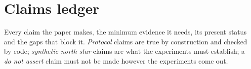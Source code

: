 \section{Claims ledger}
\label{app:claims}

Every claim the paper makes, the minimum evidence it needs, its present status and the gaps that
block it. \emph{Protocol} claims are true by construction and checked by code; \emph{synthetic north
star} claims are what the experiments must establish; a \emph{do not assert} claim must not be made
however the experiments come out.

\newcommand\claimentry[5]{%
  \par\smallskip\noindent
  \begin{tcolorbox}[enhanced, breakable, colback=ezpaper, colframe=ezpaper, arc=1.5pt,
      left=7pt, right=7pt, top=4pt, bottom=4pt, before skip=3pt, after skip=3pt, fontupper=\small]
  {\sffamily\sbseries\color{ezaccent}#1}\quad #2\hfill{\sffamily\footnotesize\color{ezgrey}#4}\par
  {\footnotesize\sffamily
  \textcolor{ezgrey}{Minimum evidence}\enspace #3\par
  \textcolor{ezgrey}{Blocked by}\enspace #5}
  \end{tcolorbox}}


